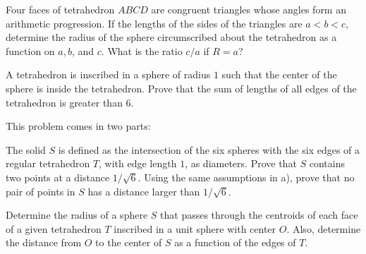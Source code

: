 \begin{question}[name={1983 IMO Longlist}]
	Four faces of tetrahedron $ABCD$ are congruent triangles whose angles form an arithmetic progression. If the lengths of the sides of the triangles are $a < b < c$, determine the radius of the sphere circumscribed about the tetrahedron as a function on $a, b$, and $c$. What is the ratio $c/a$ if $R = a$?
\end{question}


\begin{question}[name={1984 IMO Longlist}]
	A tetrahedron is inscribed in a sphere of radius $1$ such that the center of the sphere is inside the tetrahedron. Prove that the sum of lengths of all edges of the tetrahedron is greater than $6$.
\end{question}



\begin{question}[name={1985 IMO Longlist}]
	This problem comes in two parts:
	\begin{tasks}
		\task The solid $S$ is defined as the intersection of the six spheres with the six edges of a regular tetrahedron $T$, with edge length $1$, as diameters. Prove that $S$ contains two points at a distance $1/\sqrt 6$.
		\task Using the same assumptions in a), prove that no pair of points in $S$ has a distance larger than $1/\sqrt 6$.
	\end{tasks}
\end{question}




\begin{question}[name={1985 IMO Longlist}]
	Determine the radius of a sphere $S$ that passes through the centroids of each face of a given tetrahedron $T$ inscribed in a unit sphere with center $O$. Also, determine the distance from $O$ to the center of $S$ as a function of the edges of $T$.
\end{question}

